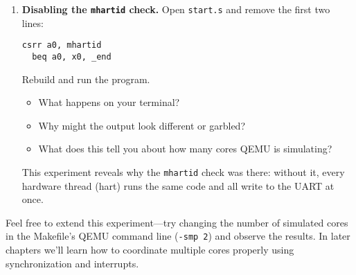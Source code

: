 \begin{enumerate}
  \item \textbf{Disabling the \texttt{mhartid} check.}
  Open \texttt{start.s} and remove the first two lines:
  \begin{lstlisting}[style=oscode,language={[x86masm]Assembler}]
  csrr a0, mhartid
  beq a0, x0, _end
  \end{lstlisting}
  Rebuild and run the program.
  \begin{itemize}
    \item What happens on your terminal?
    \item Why might the output look different or garbled?
    \item What does this tell you about how many cores QEMU is simulating?
  \end{itemize}
  This experiment reveals why the \texttt{mhartid} check was there: without it,
  every hardware thread (hart) runs the same code and all write to the UART at
  once.
\end{enumerate}

\bigskip
\noindent
Feel free to extend this experiment—try changing the number of simulated cores
in the Makefile’s QEMU command line (\texttt{-smp 2}) and observe the results.
In later chapters we’ll learn how to coordinate multiple cores properly using
synchronization and interrupts.
